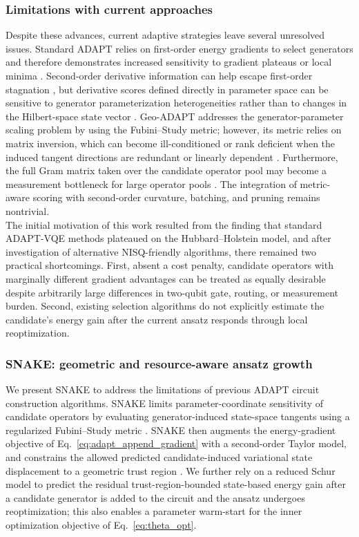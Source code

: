 \documentclass[
  reprint,
  amsmath,
  amssymb,
  aps,
  pra,
  nofootinbib,
  superscriptaddress,
  floatfix
]{revtex4-2}
\begin{document}
\subsubsection{Limitations with current approaches}
Despite these advances, current adaptive strategies leave several unresolved issues. Standard ADAPT relies on first-order energy gradients to select generators \cite{Grimsley2019,Tang2021,Yordanov2021} and therefore demonstrates increased sensitivity to gradient plateaus or local minima \cite{Feniou2023,Grimsley2023ADAPT}.
Second-order derivative information can help escape first-order stagnation \cite{Ramoa2025HessianRecycling}, but derivative scores defined directly in parameter space can be sensitive to generator parameterization heterogeneities rather than to changes in the Hilbert-space state vector \cite{ProvostVallee1980,Stokes2020QNG}. Geo-ADAPT addresses the generator-parameter scaling problem by using the Fubini--Study metric; however, its metric relies on matrix inversion, which can become ill-conditioned or rank deficient when the induced tangent directions are redundant or linearly dependent \cite{Sohail2026GeoADAPT}. Furthermore, the full Gram matrix taken over the candidate operator pool may become a measurement bottleneck for large operator pools \cite{Ramoa2025HessianRecycling,Ikhtiarudin2025ShotEfficient}. The integration of metric-aware scoring with second-order curvature, batching, and pruning remains nontrivial.\\
\noindent
The initial motivation of this work resulted from the finding that standard ADAPT-VQE methods plateaued on the Hubbard--Holstein model, and after investigation of alternative NISQ-friendly algorithms, there remained two practical shortcomings. First, absent a cost penalty, candidate operators with marginally different gradient advantages can be treated as equally desirable despite arbitrarily large differences in two-qubit gate, routing, or measurement burden. Second, existing selection algorithms do not explicitly estimate the candidate's energy gain after the current ansatz responds through local reoptimization. 




%
\subsubsection{\textsc{SNAKE}: geometric and resource-aware ansatz growth}
We present \textsc{SNAKE} to address the limitations of previous ADAPT circuit construction algorithms. \textsc{SNAKE} limits parameter-coordinate sensitivity of candidate operators by evaluating generator-induced state-space tangents using a regularized Fubini--Study metric \cite{Sohail2026GeoADAPT}. \textsc{SNAKE} then augments the energy-gradient objective of Eq.~\eqref{eq:adapt_append_gradient} with a second-order Taylor model, and constrains the allowed predicted candidate-induced variational state displacement to a geometric trust region \cite{Nocedal2006TrustRegion}. We further rely on a reduced Schur model to predict the residual trust-region-bounded state-based energy gain after a candidate generator is added to the circuit and the ansatz undergoes reoptimization; this also enables a parameter warm-start for the inner optimization objective of Eq.~\eqref{eq:theta_opt}.
\end{document}
